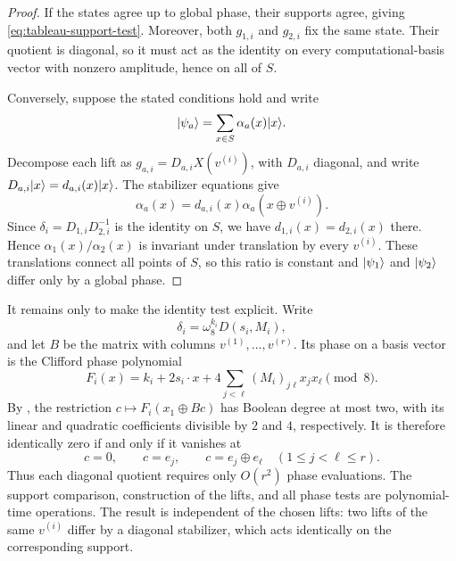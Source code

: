\begin{proof}
    If the states agree up to global phase, their supports agree, giving
    \cref{eq:tableau-support-test}. Moreover, both \(g_{1,i}\) and
    \(g_{2,i}\) fix the same state. Their quotient is diagonal, so it must
    act as the identity on every computational-basis vector with nonzero
    amplitude, hence on all of \(S\).

    Conversely, suppose the stated conditions hold and write
    \begin{equation}
        |\psi_a\rangle=\sum_{x\in S}\alpha_a(x)|x\rangle.
    \end{equation}
    Decompose each lift as \(g_{a,i}=D_{a,i}X(v^{(i)})\), with \(D_{a,i}\)
    diagonal, and write
    \(D_{a,i}|x\rangle=d_{a,i}(x)|x\rangle\). The stabilizer equations give
    \begin{equation}
        \alpha_a(x)=d_{a,i}(x)\alpha_a(x\oplus v^{(i)}).
    \end{equation}
    Since
    \(\delta_i=D_{1,i}D_{2,i}^{-1}\) is the identity on \(S\), we have
    \(d_{1,i}(x)=d_{2,i}(x)\) there. Hence
    \(\alpha_1(x)/\alpha_2(x)\) is invariant under translation by every
    \(v^{(i)}\). These translations connect all points of \(S\), so this ratio
    is constant and \(|\psi_1\rangle\) and \(|\psi_2\rangle\) differ only by a
    global phase.
\end{proof}

It remains only to make the identity test explicit. Write
\begin{equation}
    \delta_i=\omega_8^{k_i}D(s_i,M_i),
\end{equation}
and let \(B\) be the matrix with columns \(v^{(1)},\ldots,v^{(r)}\). Its phase on a
basis vector is the Clifford phase polynomial
\begin{equation}
    F_i(x)
    =k_i+2s_i\cdot x
      +4\sum_{j<\ell}(M_i)_{j\ell}x_jx_\ell
      \pmod 8.
\end{equation}
By ,
the restriction \(c\mapsto F_i(x_1\oplus Bc)\) has Boolean degree at most
two, with its linear and quadratic coefficients divisible by \(2\) and \(4\),
respectively. It is therefore identically zero if and only if it vanishes at
\begin{equation}
    c=0,
    \qquad c=e_j,
    \qquad c=e_j\oplus e_\ell
    \quad (1\leq j<\ell\leq r).
    \label{eq:tableau-phase-test-points}
\end{equation}
Thus each diagonal quotient requires only \(O(r^2)\) phase evaluations. The
support comparison, construction of the lifts, and all phase tests are
polynomial-time operations. The result is independent of the chosen lifts:
two lifts of the same \(v^{(i)}\) differ by a diagonal stabilizer, which acts
identically on the corresponding support.
